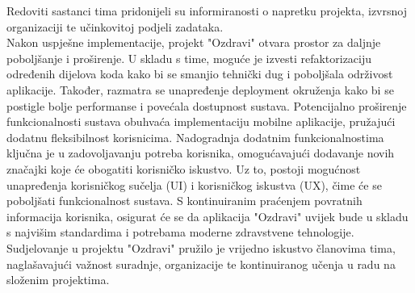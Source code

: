 		 Redoviti sastanci tima pridonijeli su informiranosti o napretku projekta, izvrsnoj organizaciji te učinkovitoj podjeli zadataka. \\
		 Nakon uspješne implementacije, projekt "Ozdravi" otvara prostor za daljnje poboljšanje i proširenje. U skladu s time, moguće je izvesti refaktorizaciju određenih dijelova koda kako bi se smanjio tehnički dug i poboljšala održivost aplikacije. Također, razmatra se unapređenje deployment okruženja kako bi se postigle bolje performanse i povećala dostupnost sustava.
		 Potencijalno proširenje funkcionalnosti sustava obuhvaća implementaciju mobilne aplikacije, pružajući dodatnu fleksibilnost korisnicima. Nadogradnja dodatnim funkcionalnostima ključna je u zadovoljavanju potreba korisnika, omogućavajući dodavanje novih značajki koje će obogatiti korisničko iskustvo. Uz to, postoji mogućnost unapređenja korisničkog sučelja (UI) i korisničkog iskustva (UX), čime će se poboljšati funkcionalnost sustava. S kontinuiranim praćenjem povratnih informacija korisnika, osigurat će se da aplikacija "Ozdravi" uvijek bude u skladu s najvišim standardima i potrebama moderne zdravstvene tehnologije. \\
		 Sudjelovanje u projektu "Ozdravi" pružilo je vrijedno iskustvo članovima tima, naglašavajući važnost suradnje, organizacije te kontinuiranog učenja u radu na složenim projektima.
		\eject 